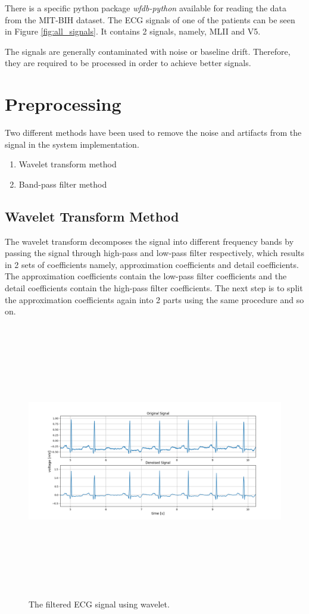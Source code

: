 There is a specific python package \textit{wfdb-python} available for reading the data from the MIT-BIH dataset. The ECG signals of one of the patients can be seen in Figure \ref{fig:all_signals}. It contains 2 signals, namely, MLII and V5.




The signals are generally contaminated with noise or baseline drift. Therefore, they are required to be processed in order to achieve better signals.


\section{Preprocessing}
Two different methods have been used to remove the noise and artifacts from the signal in the system implementation.

\begin{enumerate}
	\item Wavelet transform method
	\item Band-pass filter method
\end{enumerate}

\subsection{Wavelet Transform Method}

The wavelet transform decomposes the signal into different frequency bands by passing the signal through high-pass and low-pass filter respectively, which results in 2 sets of coefficients namely, approximation coefficients and detail coefficients. The approximation coefficients contain the low-pass filter coefficients and the detail coefficients contain the high-pass filter coefficients. The next step is to split the approximation coefficients again into 2 parts using the same procedure and so on.

\begin{figure}[h]
	\centering
	\includegraphics[width=15cm,height=12cm,keepaspectratio=true]{images/wavelet_denoised_1}
	\caption{
		The filtered ECG signal using wavelet.
	}
	\label{fig:wavelet_denoised}
\end{figure}


